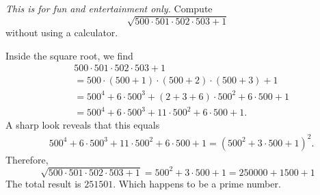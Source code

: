 \documentclass[11pt]{article}
\begin{document}

\begin{exercise}
\end{exercise}
\begin{solution}     
\end{solution}

\begin{exercise}
\end{exercise}
\begin{solution}     
\end{solution}

\begin{exercise}
    \textit{This is for fun and entertainment only.}
    Compute 
    \[
        \sqrt{ 500 \cdot 501 \cdot 502 \cdot 503 + 1 }
    \]
    without using a calculator.
\end{exercise}
\begin{solution}
    Inside the square root, we find 
    \begin{align*}
        &
        500 \cdot 501 \cdot 502 \cdot 503 + 1
        \\&=
        500 \cdot (500+1) \cdot (500+2) \cdot (500+3) + 1
        \\&=
        500^4 + 6 \cdot 500^3 + ( 2 + 3 + 6 ) \cdot 500^2 + 6 \cdot 500 + 1
        \\&=
        500^4 + 6 \cdot 500^3 + 11 \cdot 500^2 + 6 \cdot 500 + 1
        .
    \end{align*}
    A sharp look reveals that this equals 
    \begin{align*}
        &
        500^4 + 6 \cdot 500^3 + 11 \cdot 500^2 + 6 \cdot 500 + 1
        =
        ( 500^2 + 3 \cdot 500 + 1 )^2
        .
    \end{align*}
    Therefore,
    \[
        \sqrt{ 500 \cdot 501 \cdot 502 \cdot 503 + 1 } = 500^2 + 3 \cdot 500 + 1 = 250000 + 1500 + 1
    \]
    The total result is $251501$. Which happens to be a prime number.
\end{solution}
\end{document}
